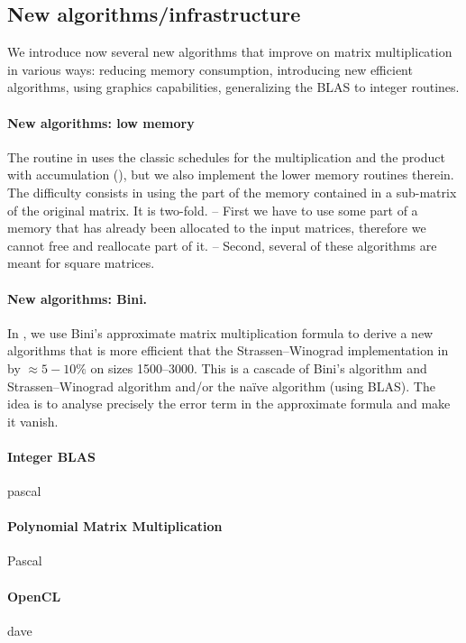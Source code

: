 \subsection{New algorithms/infrastructure}
%
We introduce now several new algorithms that improve on matrix multiplication
in various ways: reducing memory consumption, introducing new efficient
algorithms, using graphics capabilities, generalizing the BLAS to integer
routines.
%
\paragraph{New algorithms: low memory}
%
The routine \fgemm in \fflas uses the classic schedules for the multiplication and
the product with accumulation (\cf \cite{Boyer:2009:sched}), but we also
implement the lower memory routines therein.
%
%
The difficulty consists in using the part of the memory contained in a
sub-matrix of the original matrix. It is two-fold. -- First we have to use some
part of a memory that has already been allocated to the input matrices,
therefore we cannot free and reallocate part of it. -- Second, several of these
algorithms are meant for square matrices.
%
%
%
\paragraph{New algorithms: Bini.}
%
In \cite{BD:2014:Bini}, we use Bini's approximate matrix multiplication formula
to derive a new algorithms that is more efficient that the Strassen--Winograd
implementation in \fgemm by $\approx 5-10\%$ on sizes \num{1500}--\num{3000}.
This is a cascade of Bini's algorithm and Strassen--Winograd algorithm and/or
the naïve algorithm (using BLAS). The idea is to analyse precisely the error
term in the approximate formula and make it vanish.
%
\paragraph{Integer BLAS}
%
\danger pascal
%
\paragraph{Polynomial Matrix Multiplication}
\danger Pascal
\paragraph{OpenCL}
%
\danger dave
